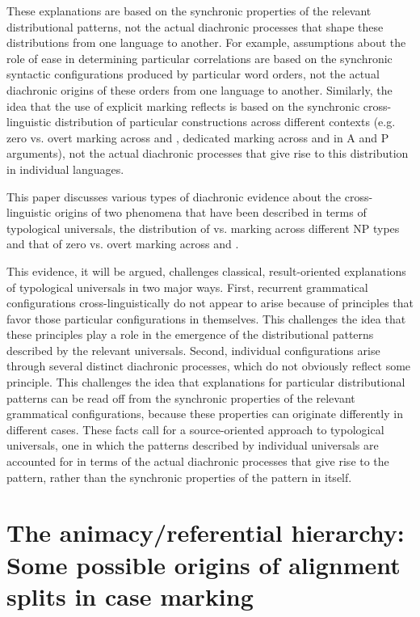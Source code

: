 \documentclass[output=paper]{langsci/langscibook}
\begin{document}
These explanations are based on the synchronic properties of the
relevant distributional patterns, not the actual diachronic processes
that shape these distributions from one language to another. For
example, assumptions about the role of  ease in determining particular  correlations are based on the synchronic syntactic configurations   produced by particular word orders, not the actual diachronic origins of these orders from one language to another. Similarly, the idea that the use of explicit marking reflects  is based on the synchronic cross-linguistic distribution of particular
constructions across different contexts (e.g. zero vs. overt marking
across  and , dedicated  marking across  and
in A and P arguments), not the actual diachronic processes that give rise to this distribution in individual languages. 

This paper discusses various types of diachronic evidence about the
cross-linguistic origins of two phenomena that have been described in
terms of typological universals, the distribution of  vs.
  marking  across different NP types and that of
zero vs. overt marking across  and . 

This evidence, it will be argued, challenges classical, result-oriented explanations of typological universals in two major ways.  First, recurrent grammatical configurations cross-linguistically do not appear to arise because of principles that favor those particular configurations in themselves. This challenges the idea that these principles play a
role in the emergence of the distributional patterns described by the
relevant universals.  
Second, individual configurations arise through several distinct
  diachronic processes, which do not obviously reflect some
   principle. This challenges the idea that explanations for
  particular distributional patterns can be read off from the
  synchronic properties of the relevant grammatical configurations,
  because these properties can originate differently in different
  cases. 
These facts call for a source-oriented approach to typological universals, one in which the patterns described by individual universals are accounted for in terms of the actual diachronic processes that give rise to the pattern, rather than the synchronic properties of the  pattern in itself.

\section{The animacy/referential hierarchy: Some possible origins of
  {alignment} splits in {case} marking}
  \label{alignment}
\end{document}
